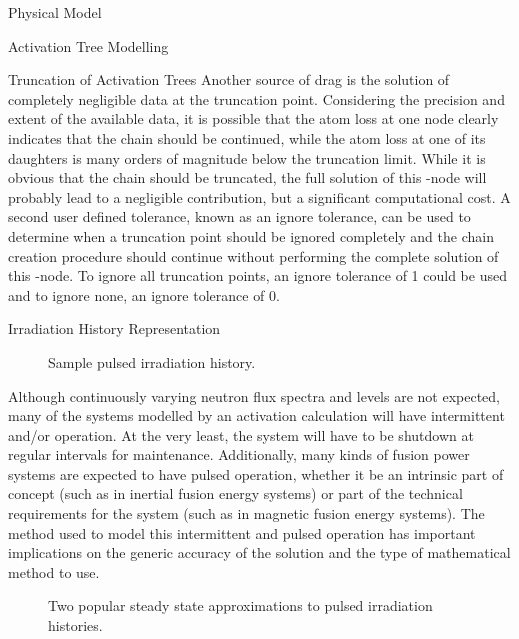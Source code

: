 \begin{chapter}{Physical Model\label{chap:physical}}
\begin{section}{Activation Tree Modelling\label{sec:physical.chains}}
\begin{subsection}{Truncation of Activation Trees}
    Another source of drag is the solution of completely negligible
    data at the truncation point.  Considering the precision and
    extent of the available data, it is possible that the atom loss at
    one node clearly indicates that the chain should be continued,
    while the atom loss at one of its daughters is many orders of
    magnitude below the truncation limit.  While it is obvious that
    the chain should be truncated, the full solution of this \pc-node
    will probably lead to a negligible contribution, but a significant
    computational cost.  A second user defined tolerance, known as an
    ignore tolerance, can be used to determine when a truncation point
    should be ignored completely and the chain creation procedure
    should continue without performing the complete solution of this
    \pc-node.  To ignore all truncation points, an ignore tolerance of
    1 could be used and to ignore none, an ignore tolerance of 0.
    
  \end{subsection}
\end{section}

\begin{section}{Irradiation History Representation}
  
  \begin{figure}[htbp]
    \begin{center}
      \leavevmode
      \caption{Sample pulsed irradiation history.}
      \label{fig:physical.pulses}
    \end{center}
  \end{figure}

  Although continuously varying neutron flux spectra and levels are
  not expected, many of the systems modelled by an activation
  calculation will have intermittent and/or operation.  At the very
  least, the system will have to be shutdown at regular intervals for
  maintenance.  Additionally, many kinds of fusion power systems are
  expected to have pulsed operation, whether it be an intrinsic part
  of concept (such as in inertial fusion energy systems) or part of
  the technical requirements for the system (such as in magnetic
  fusion energy systems).  The method used to model this intermittent
  and pulsed operation has important implications on the generic
  accuracy of the solution and the type of mathematical method to use.
  
  \begin{figure}[htbp]
    \begin{center}
         \caption{Two popular steady state approximations to pulsed irradiation histories.}\label{fig:physical.ss_approx}
    \end{center}
  \end{figure}


\end{section}
\end{chapter}
